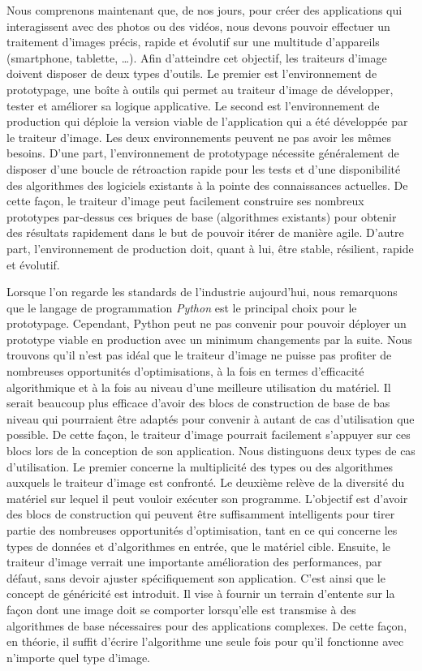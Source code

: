 Nous comprenons maintenant que, de nos jours, pour créer des applications qui interagissent avec des photos ou des
vidéos, nous devons pouvoir effectuer un traitement d'images précis, rapide et évolutif sur une multitude d'appareils
(smartphone, tablette, \ldots). Afin d'atteindre cet objectif, les traiteurs d'image doivent disposer de deux types
d'outils. Le premier est l'environnement de prototypage, une boîte à outils qui permet au traiteur d'image de
développer, tester et améliorer sa logique applicative. Le second est l'environnement de production qui déploie la
version viable de l'application qui a été développée par le traiteur d'image. Les deux environnements peuvent ne pas
avoir les mêmes besoins. D'une part, l'environnement de prototypage nécessite généralement de disposer d'une boucle de
rétroaction rapide pour les tests et d'une disponibilité des algorithmes des logiciels existants à la pointe des
connaissances actuelles. De cette façon, le traiteur d'image peut facilement construire ses nombreux prototypes
par-dessus ces briques de base (algorithmes existants) pour obtenir des résultats rapidement dans le but de pouvoir
itérer de manière agile. D'autre part, l'environnement de production doit, quant à lui, être stable, résilient, rapide
et évolutif.

Lorsque l'on regarde les standards de l'industrie aujourd'hui, nous remarquons que le langage de programmation
\emph{Python} est le principal choix pour le prototypage. Cependant, Python peut ne pas convenir pour pouvoir déployer
un prototype viable en production avec un minimum changements par la suite. Nous trouvons qu'il n'est pas idéal que le
traiteur d'image ne puisse pas profiter de nombreuses opportunités d'optimisations, à la fois en termes d'efficacité
algorithmique et à la fois au niveau d'une meilleure utilisation du matériel. Il serait beaucoup plus efficace d'avoir
des blocs de construction de base de bas niveau qui pourraient être adaptés pour convenir à autant de cas d'utilisation
que possible. De cette façon, le traiteur d'image pourrait facilement s'appuyer sur ces blocs lors de la conception de
son application. Nous distinguons deux types de cas d'utilisation. Le premier concerne la multiplicité des types ou des
algorithmes auxquels le traiteur d'image est confronté. Le deuxième relève de la diversité du matériel sur lequel il
peut vouloir exécuter son programme. L'objectif est d'avoir des blocs de construction qui peuvent être suffisamment
intelligents pour tirer partie des nombreuses opportunités d'optimisation, tant en ce qui concerne les types de données
et d'algorithmes en entrée, que le matériel cible. Ensuite, le traiteur d'image verrait une importante amélioration des
performances, par défaut, sans devoir ajuster spécifiquement son application. C'est ainsi que le concept de généricité
est introduit. Il vise à fournir un terrain d'entente sur la façon dont une image doit se comporter lorsqu'elle est
transmise à des algorithmes de base nécessaires pour des applications complexes. De cette façon, en théorie, il suffit
d'écrire l'algorithme une seule fois pour qu'il fonctionne avec n'importe quel type d'image.

